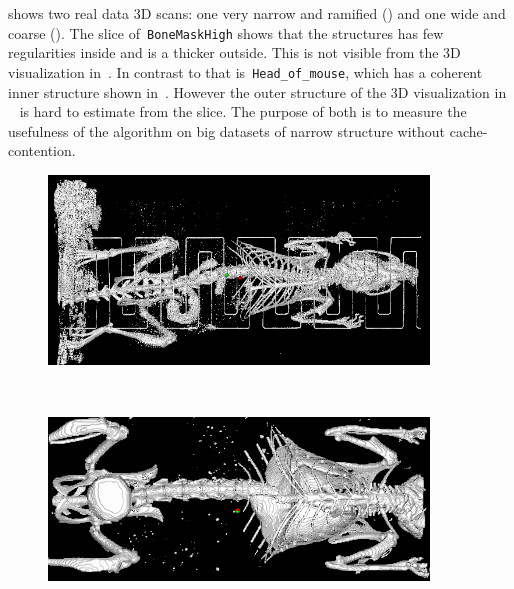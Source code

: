 \documentclass{article}
\begin{document}
 shows two real data 3D scans: one very narrow and ramified () and one wide and coarse ().
The slice of~\texttt{BoneMaskHigh} shows that the structures has few regularities inside and is a thicker outside. This is not visible from the 3D visualization in~.
In contrast to that is~\texttt{Head\_of\_mouse}, which has a coherent inner structure shown in~.
However the outer structure of the 3D visualization in ~ is hard to estimate from the slice.
The purpose of both is to measure the usefulness of the algorithm on big datasets of narrow structure without cache-contention.

\begin{figure}[h!]
\centering \vskip 0pt
\begin{minipage}[t]{0.5\textwidth}%
  \centering \vskip 0pt
  \begin{minipage}[t]{\textwidth}%
    \centering \vskip 0pt
    \includegraphics[width=0.9\textwidth]{images/maus_mit_draht_unprocessed.png}
    \label{fig:mausmitdraht_unproc}
  \end{minipage}%
  \\
  \begin{minipage}[t]{\textwidth}%
    \centering \vskip 0pt
    \includegraphics[width=0.9\textwidth]{images/skeleton_unprocessed.png}

\end{minipage}
\end{minipage}
\end{figure}
\end{document}
